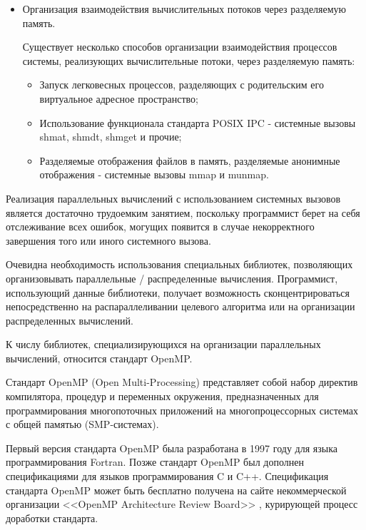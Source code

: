 \begin{itemize}
	\item Организация взаимодействия вычислительных потоков через разделяемую память.

	Существует несколько способов организации взаимодействия процессов системы, реализующих вычислительные потоки, через разделяемую память:

	\begin{itemize}

		\item Запуск легковесных процессов, разделяющих с родительским его виртуальное адресное пространство;
		\item Использование функционала стандарта POSIX IPC - системные вызовы shmat, shmdt, shmget и прочие;
		\item Разделяемые отображения файлов в память, разделяемые анонимные отображения - системные вызовы mmap и munmap.

	\end{itemize}

\end{itemize}

Реализация параллельных вычислений с использованием системных вызовов \linebreak \gl является достаточно трудоемким занятием, поскольку программист берет на себя отслеживание всех ошибок, могущих появится в случае некорректного завершения того или иного системного вызова.

Очевидна необходимость использования специальных библиотек, позволяющих организовывать параллельные / распределенные вычисления. Программист, использующий данные библиотеки, получает возможность сконцентрироваться непосредственно на распараллеливании целевого алгоритма или на организации распределенных вычислений.

К числу библиотек, специализирующихся на организации параллельных вычислений, относится стандарт OpenMP.


Стандарт OpenMP (Open Multi-Processing) представляет собой набор директив компилятора, процедур и переменных окружения, предназначенных для программирования многопоточных приложений на многопроцессорных системах с общей памятью (SMP-системах).

Первый версия стандарта OpenMP была разработана в 1997 году для языка программирования Fortran. Позже стандарт OpenMP был дополнен спецификациями для языков программирования C и C++. Спецификация стандарта OpenMP может быть бесплатно получена на сайте некоммерческой организации <<OpenMP Architecture Review Board>> \cite{openmp}, курирующей процесс доработки стандарта.

